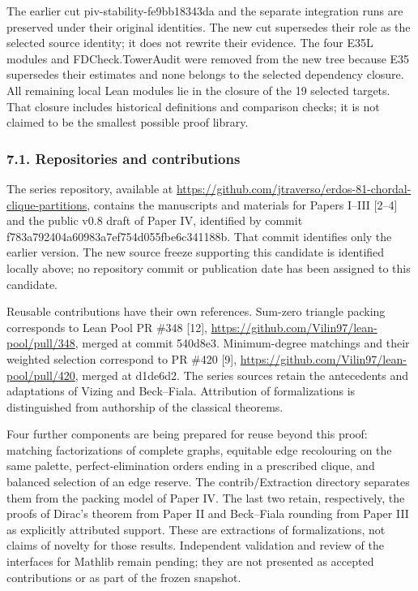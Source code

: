 \documentclass[english,11pt,a4paper]{article}
\newcounter{none}
\begin{document}
The earlier cut {\ttfamily\small piv-\discretionary{\hbox{\ensuremath{\hookrightarrow}}}{}{}stability-\discretionary{\hbox{\ensuremath{\hookrightarrow}}}{}{}fe9bb18343da} and the separate integration runs are preserved under their original identities. The new cut supersedes their role as the selected source identity; it does not rewrite their evidence. The four E35L modules and FDCheck.TowerAudit were removed from the new tree because E35 supersedes their estimates and none belongs to the selected dependency closure. All remaining local Lean modules lie in the closure of the 19 selected targets. That closure includes historical definitions and comparison checks; it is not claimed to be the smallest possible proof library.

\subsubsection{7.1. Repositories and contributions}\label{repositories-and-contributions}

The series repository, available at \url{https://github.com/jtraverso/erdos-81-chordal-clique-partitions}, contains the manuscripts and materials for Papers I--III {[}2--4{]} and the public v0.8 draft of Paper IV, identified by commit {\ttfamily\small f783a792404a\discretionary{\hbox{\ensuremath{\hookrightarrow}}}{}{}60983a7ef754\discretionary{\hbox{\ensuremath{\hookrightarrow}}}{}{}d055fbe6c341\discretionary{\hbox{\ensuremath{\hookrightarrow}}}{}{}188b}. That commit identifies only the earlier version. The new source freeze supporting this candidate is identified locally above; no repository commit or publication date has been assigned to this candidate.

Reusable contributions have their own references. Sum-zero triangle packing corresponds to Lean Pool PR \#348 {[}12{]}, \url{https://github.com/Vilin97/lean-pool/pull/348}, merged at commit {\ttfamily\small 540d8e3}. Minimum-degree matchings and their weighted selection correspond to PR \#420 {[}9{]}, \url{https://github.com/Vilin97/lean-pool/pull/420}, merged at {\ttfamily\small d1de6d2}. The series sources retain the antecedents and adaptations of Vizing and Beck--Fiala. Attribution of formalizations is distinguished from authorship of the classical theorems.

Four further components are being prepared for reuse beyond this proof: matching factorizations of complete graphs, equitable edge recolouring on the same palette, perfect-elimination orders ending in a prescribed clique, and balanced selection of an edge reserve. The {\ttfamily\small contrib/\discretionary{\hbox{\ensuremath{\hookrightarrow}}}{}{}Extraction} directory separates them from the packing model of Paper IV. The last two retain, respectively, the proofs of Dirac's theorem from Paper II and Beck--Fiala rounding from Paper III as explicitly attributed support. These are extractions of formalizations, not claims of novelty for those results. Independent validation and review of the interfaces for Mathlib remain pending; they are not presented as accepted contributions or as part of the frozen snapshot.
\end{document}
